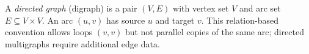 
A \emph{directed graph} (digraph) is a pair $(V,E)$ with vertex set $V$ and arc set $E\subseteq V\times V$. An arc $(u,v)$ has source $u$ and target $v$. This relation-based convention allows loops $(v,v)$ but not parallel copies of the same arc; directed multigraphs require additional edge data.
